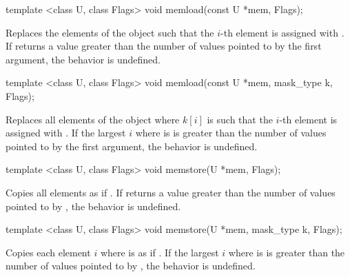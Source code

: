 \begin{itemdecl}
template <class U, class Flags> void memload(const U *mem, Flags);
\end{itemdecl}
\begin{itemdescr}
  \pnum\effects Replaces the elements of the \datapar object such that the $i$-th element is assigned with  \foralli.
  \pnum\remarks If  returns a value greater than the number of values pointed to by the first argument, the behavior is undefined.
\end{itemdescr}

\begin{itemdecl}
template <class U, class Flags> void memload(const U *mem, mask_type k, Flags);
\end{itemdecl}
\begin{itemdescr}
  \pnum\effects Replaces all elements of the \datapar object where $k[i]$ is \true such that the $i$-th element is assigned with  \foralli.
  \pnum\remarks If the largest $i$ where  is \true is greater than the number of values pointed to by the first argument, the behavior is undefined.
\end{itemdescr}

\begin{itemdecl}
template <class U, class Flags> void memstore(U *mem, Flags);
\end{itemdecl}
\begin{itemdescr}
  \pnum\effects Copies all \datapar elements as if  \foralli.
  \pnum\remarks If  returns a value greater than the number of values pointed to by , the behavior is undefined.
\end{itemdescr}

\begin{itemdecl}
template <class U, class Flags> void memstore(U *mem, mask_type k, Flags);
\end{itemdecl}
\begin{itemdescr}
  \pnum\effects Copies each \datapar element $i$ where  is \true as if  \foralli.
  \pnum\remarks If the largest $i$ where  is \true is greater than the number of values pointed to by , the behavior is undefined.
\end{itemdescr}

